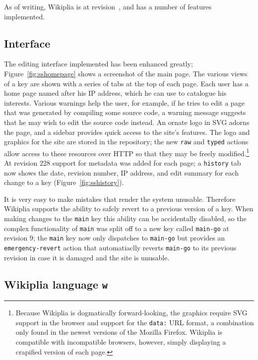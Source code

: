 \documentclass[twocolumn]{article}
\begin{document}
As of writing, Wikiplia is at revision~\currentrevision, and has
a number of features implemented.

\subsection{Interface}

The editing interface implemented has been enhanced greatly;
Figure~\ref{fig:sshomepage} shows a screenshot of the main page. The
various views of a key are shown with a series of tabs at the top of
each page. Each user has a home page named after his IP
address,\z{} which he can use to catalogue his
interests. Various warnings help the user, for example, if he tries to
edit a page that was generated by compiling some source code, a
warning message suggests that he may wish to edit the source code
instead. An ornate logo in SVG adorns
the page, and a sidebar provides quick access to the site's features.
The logo and graphics for the site are stored in the repository; the
new {\tt raw} and {\tt typed} actions allow access to these resources
over HTTP so that they may be freely modified.\z\footnote{Because
Wikiplia is dogmatically forward-looking, the graphics require SVG
support in the browser and support for the {\tt data:} URL format, a
combination only found in the newest versions of the Mozilla Firefox.
Wikiplia is compatible with incompatible browsers, however, simply
displaying a crapified version of each page.} At revision 228 support
for metadata was added for each page; a {\tt history} tab now shows
the date, revision number, IP address, and edit summary for each
change to a key (Figure~\ref{fig:sshistory}).

It is very easy to make mistakes that render the system unusable.
Therefore Wikiplia supports the ability to safely revert to a previous
version of a key. When making changes to the {\tt main} key this
ability can be accidentally disabled, so the complex functionality of
{\tt main} was split off to a new key called {\tt main-go} at revision
9; the {\tt main} key now only dispatches to {\tt main-go} but
provides an {\tt emergency-revert} action that automatiaclly reverts
{\tt main-go} to its previous revision in case it is damaged and the
site is unusable.

\subsection{Wikiplia language {\tt w}}
\end{document}
